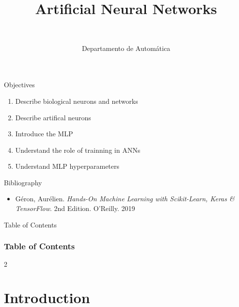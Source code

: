 \documentclass[10pt,compress]{beamer} %
\title[Aritificial Neural Networks]{Artificial Neural Networks}
\author{\asignatura\\\carrera}
\institute{}
\date{Departamento de Automática}
\begin{document}
{\titlepageBlue
    \begin{frame}
        \titlepage
    \end{frame}
}

\institute{\asignatura}

\begin{frame}[plain]{}
   \begin{block}{Objectives}
      \begin{enumerate}
         \item Describe biological neurons and networks
         \item Describe artifical neurons
	     \item Introduce the MLP
         \item Understand the role of trainning in ANNs
	     \item Understand MLP hyperparameters
      \end{enumerate} 
   \end{block}

   \begin{block}{Bibliography}
	\begin{itemize}
        \item G\'eron, Aur\'elien. \textit{Hands-On Machine Learning with Scikit-Learn, Keras \& TensorFlow}. 2nd Edition. O'Reilly. 2019
	\end{itemize}
   \end{block}
\end{frame}

{
\begin{frame}[shrink]{Table of Contents}
 \frametitle{Table of Contents}

    \begin{multicols}{2}
    \tableofcontents
    \end{multicols}
\end{frame}
}

\section{Introduction}
\end{document}
